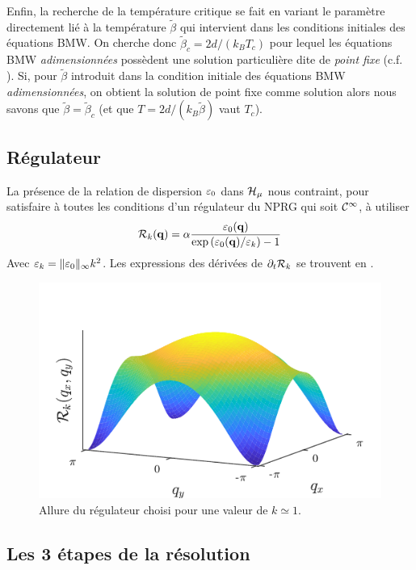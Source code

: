 \documentclass[10.5pt]{article}
\begin{document}
\begin{multicols}{2}
Enfin, la recherche de la température critique se fait en variant le paramètre directement lié à la température $\tilde{\beta}$ qui intervient dans les conditions initiales des équations BMW. On cherche donc $\tilde{\beta}_c = 2d/(k_BT_c)$ pour lequel les équations BMW \textit{adimensionnées} possèdent une solution particulière dite de \textit{point fixe} (c.f. ). Si, pour $\tilde{\beta}$ introduit dans la condition initiale des équations BMW \textit{adimensionnées}, on obtient la solution de point fixe comme solution alors nous savons que $\tilde{\beta}=\tilde{\beta}_c$ (et que $T = 2d/(k_B\tilde{\beta})$ vaut $T_c$).\\



\subsection{Régulateur}

La présence de la relation de dispersion $\varepsilon_0$ dans $\mathcal{H}_\mu$ nous contraint, pour satisfaire à toutes les conditions d'un régulateur du NPRG qui soit $\mathcal{C}^\infty$, à utiliser
\begin{equation}
	\mathcal{R}_k({\bf q}) = \alpha \frac{\varepsilon_0({\bf q})}{\exp{(\varepsilon_0({\bf q})/\varepsilon_k)} -1}
\end{equation}
Avec $\varepsilon_k = \| \varepsilon_0 \|_\infty k^2$. Les expressions des dérivées de $\partial_t \mathcal{R}_k$ se trouvent en . 
\begin{figure}[H]
\begin{center}
	\includegraphics[width=0.8\columnwidth]{RegIsing.pdf}
\end{center}
\caption{Allure du régulateur choisi pour une valeur de $k\simeq 1$.}
\end{figure}



\subsection{Les 3 étapes de la résolution}


\end{multicols}
\end{document}
